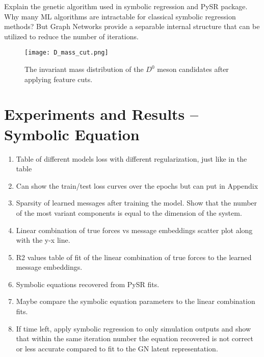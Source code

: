 \documentclass{article}
\begin{document}
Explain the genetic algorithm used in symbolic regression and PySR package. Why many ML algorithms are intractable for classical symbolic regression methods? But Graph Networks provide a separable internal structure that can be utilized to reduce the number of iterations.

\begin{figure}[h]
\centering
\texttt{[image: D\_mass\_cut.png]}
\caption{The invariant mass distribution of the $D^0$ meson candidates after applying feature cuts.}
\label{fig:D_mass_cut}
\end{figure}

\section{Experiments and Results -- Symbolic Equation}

\begin{enumerate}
    \item Table of different models loss with different regularization, just like in the table
    \item Can show the train/test loss curves over the epochs but can put in Appendix
    \item Sparsity of learned messages after training the model. Show that the number of the most variant components is equal to the dimension of the system.
    \item Linear combination of true forces vs message embeddings scatter plot along with the y-x line.
    \item R2 values table of fit of the linear combination of true forces to the learned message embeddings.
    \item Symbolic equations recovered from PySR fits.
    \item Maybe compare the symbolic equation parameters to the linear combination fits.
    \item If time left, apply symbolic regression to only simulation outputs and show that within the same iteration number the equation recovered is not correct or less accurate compared to fit to the GN latent representation.
\end{enumerate}
\end{document}
